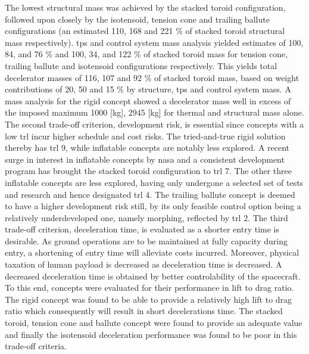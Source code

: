 The lowest structural mass was achieved by the stacked toroid configuration, followed upon closely by the isotensoid, tension cone and trailing ballute configurations (an estimated 110, 168 and 221 \% of stacked toroid structural mass respectively). \acrfull{tps} and control system mass analysis yielded estimates of 100, 84, and 76 \% and 100, 34, and 122 \% of stacked toroid mass for tension cone, trailing ballute and isotensoid configurations respectively. This yields total decelerator masses of 116, 107 and 92 \% of stacked toroid mass, based on weight contributions of 20, 50 and 15 \% by structure, \gls{tps} and control system mass. A mass analysis for the rigid concept showed a decelerator mass well in excess of the imposed maximum 1000 [kg], 2945 [kg] for thermal and structural mass alone.
\newline
\newline
The second trade-off criterion, development risk, is essential since concepts with a low \acrfull{trl} incur higher schedule and cost risks. The tried-and-true rigid solution thereby has \gls{trl} 9, while inflatable concepts are notably less explored. A recent surge in interest in inflatable concepts by \gls{nasa} and a consistent development program has brought the stacked toroid configuration to \gls{trl} 7. The other three inflatable concepts are less explored, having only undergone a selected set of tests and research and hence designated \gls{trl} 4. The trailing ballute concept is deemed to have a higher development risk still, by its only feasible control option being a relatively underdeveloped one, namely morphing, reflected by \gls{trl} 2.
\newline
\newline
The third trade-off criterion, deceleration time, is evaluated as a shorter entry time is desirable. As ground operations are to be maintained at fully capacity during entry, a shortening of entry time will alleviate costs incurred. Moreover, physical taxation of human payload is decreased as deceleration time is decreased.  A decreased deceleration time is obtained by better controlability of the spacecraft. To this end, concepts were evaluated for their performance in lift to drag ratio. The rigid concept was found to be able to provide a relatively high lift to drag ratio which consequently will result in short decelerations time. The stacked toroid, tension cone and ballute concept were found to provide an adequate value and finally the isotensoid deceleration performance was found to be poor in this trade-off criteria.
